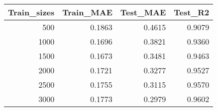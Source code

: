 \begin{tabular}{rrrr}
\toprule
Train_sizes & Train_MAE & Test_MAE & Test_R2 \\
\midrule
500 & 0.1863 & 0.4615 & 0.9079 \\
1000 & 0.1696 & 0.3821 & 0.9360 \\
1500 & 0.1673 & 0.3481 & 0.9463 \\
2000 & 0.1721 & 0.3277 & 0.9527 \\
2500 & 0.1755 & 0.3115 & 0.9570 \\
3000 & 0.1773 & 0.2979 & 0.9602 \\
\bottomrule
\end{tabular}
